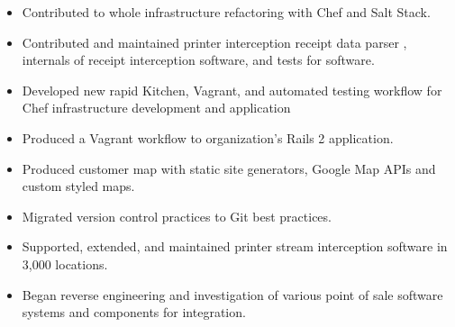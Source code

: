 \documentclass[10pt,letter,ragged2e]{altacv}
\begin{document}
\begin{paracol}{2}
\begin{itemize}
\item Contributed to whole infrastructure refactoring with Chef and Salt Stack.
\item Contributed and maintained printer interception receipt data parser , internals of receipt interception software, and tests for software.
\item Developed new rapid Kitchen, Vagrant, and automated testing workflow for Chef infrastructure development and application
\item Produced a Vagrant workflow to organization's Rails 2 application.
\item Produced customer map with static site generators, Google Map APIs and custom styled maps. 
\item Migrated version control practices to Git best practices.
\item Supported, extended, and maintained printer stream interception software in 3,000 locations.
\item Began reverse engineering and investigation of various point of sale software systems and components for integration.
\end{itemize}






\end{paracol}
\end{document}

